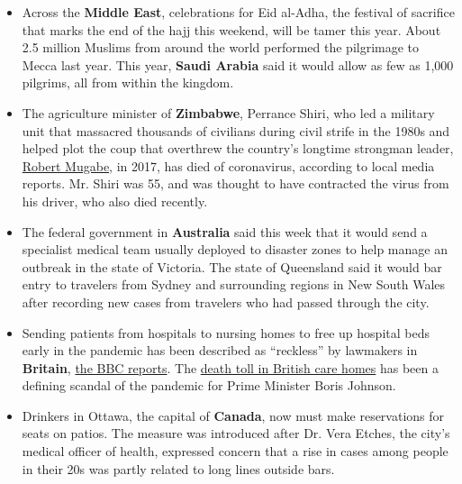 \begin{itemize}
\item
  Across the \textbf{Middle East}, celebrations for Eid al-Adha, the
  festival of sacrifice that marks the end of the hajj this weekend,
  will be tamer this year. About 2.5 million Muslims from around the
  world performed the pilgrimage to Mecca last year. This year,
  \textbf{Saudi Arabia} said it would allow as few as 1,000 pilgrims,
  all from within the kingdom.
\item
  The agriculture minister of \textbf{Zimbabwe}, Perrance Shiri, who led
  a military unit that massacred thousands of civilians during civil
  strife in the 1980s and helped plot the coup that overthrew the
  country's longtime strongman leader,
  \href{https://www.nytimes3xbfgragh.onion/2019/09/06/obituaries/robert-mugabe-dead.html}{Robert
  Mugabe}, in 2017, has died of coronavirus, according to local media
  reports. Mr. Shiri was 55, and was thought to have contracted the
  virus from his driver, who also died recently.
\item
  The federal government in \textbf{Australia} said this week that it
  would send a specialist medical team usually deployed to disaster
  zones to help manage an outbreak in the state of Victoria. The state
  of Queensland said it would bar entry to travelers from Sydney and
  surrounding regions in New South Wales after recording new cases from
  travelers who had passed through the city.
\item
  Sending patients from hospitals to nursing homes to free up hospital
  beds early in the pandemic has been described as ``reckless'' by
  lawmakers in \textbf{Britain},
  \href{https://www.bbc.com/news/uk-politics-53574265}{the BBC reports}.
  The
  \href{https://www.nytimes3xbfgragh.onion/2020/05/25/world/europe/coronavirus-uk-nursing-homes.html}{death
  toll in British care homes} has been a defining scandal of the
  pandemic for Prime Minister Boris Johnson.
\item
  Drinkers in Ottawa, the capital of \textbf{Canada}, now must make
  reservations for seats on patios. The measure was introduced after Dr.
  Vera Etches, the city's medical officer of health, expressed concern
  that a rise in cases among people in their 20s was partly related to
  long lines outside bars.
\end{itemize}

\hypertarget{-12}{%
\subsection{}\label{-12}}

